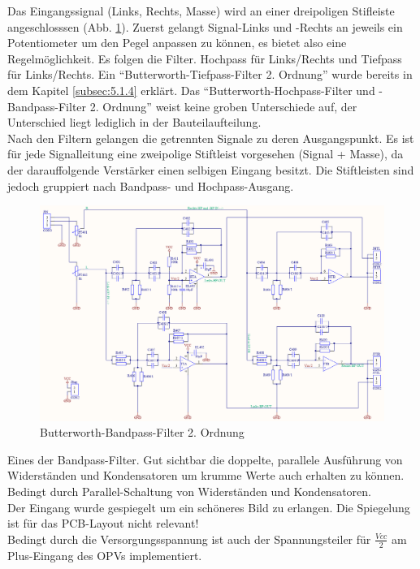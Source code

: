 Das Eingangssignal (Links, Rechts, Masse) wird an einer dreipoligen Stifleiste angeschlosssen (Abb. \ref{fig:5.2.4.1}). Zuerst gelangt Signal-Links und -Rechts an jeweils ein Potentiometer um den Pegel anpassen zu können, es bietet also eine Regelmöglichkeit. Es folgen die Filter. Hochpass für Links/Rechts und Tiefpass für Links/Rechts. Ein \enquote{Butterworth-Tiefpass-Filter 2. Ordnung} wurde bereits in dem Kapitel \ref{subsec:5.1.4} erklärt. Das \enquote{Butterworth-Hochpass-Filter und -Bandpass-Filter 2. Ordnung} weist keine groben Unterschiede auf, der Unterschied liegt lediglich in der Bauteilaufteilung.\\
Nach den Filtern gelangen die getrennten Signale zu deren Ausgangspunkt. Es ist für jede Signalleitung eine zweipolige Stiftleist vorgesehen (Signal + Masse), da der darauffolgende Verstärker einen selbigen Eingang besitzt. Die Stiftleisten sind jedoch gruppiert nach Bandpass- und Hochpass-Ausgang.\\
\begin{figure} [H]
	\centering	
	\includegraphics[width=1\textwidth]{img/Print4/4_TTuHTWeiche-Schematic.PNG}
	\caption{Butterworth-Bandpass-Filter 2. Ordnung}
	\label {fig:5.2.4.1}
\end{figure}
Eines der Bandpass-Filter. Gut sichtbar die doppelte, parallele Ausführung von Widerständen und Kondensatoren um krumme Werte auch erhalten zu können. Bedingt durch Parallel-Schaltung von Widerständen und Kondensatoren.\\ 
Der Eingang wurde gespiegelt um ein schöneres Bild zu erlangen. Die Spiegelung ist für das PCB-Layout nicht relevant!\\
Bedingt durch die Versorgungsspannung ist auch der Spannungsteiler für $\frac{Vcc}{2}$ am Plus-Eingang des OPVs implementiert.

